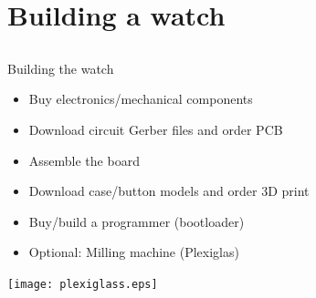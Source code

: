 \documentclass[compress,red]{beamer}
\begin{document}
\section{Building a watch}

\subsection*{} %

\begin{frame}{Building the watch}


  \begin{itemize}
  \item Buy electronics/mechanical components
  \item Download circuit Gerber files and order PCB
  \item Assemble the board
  \item Download case/button models and order 3D print
  \item Buy/build a programmer (bootloader)
  \item Optional: Milling machine (Plexiglas)
  \end{itemize}

  \begin{center}
    \texttt{[image: plexiglass.eps]}
  \end{center}


\end{frame}
\end{document}
